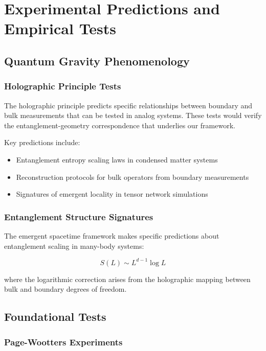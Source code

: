 \documentclass[12pt,a4paper]{article}
\begin{document}
\section{Experimental Predictions and Empirical Tests}

\subsection{Quantum Gravity Phenomenology}

\subsubsection{Holographic Principle Tests}

The holographic principle predicts specific relationships between boundary and bulk measurements that can be tested in analog systems. These tests would verify the entanglement-geometry correspondence that underlies our framework.

Key predictions include:
\begin{itemize}
    \item Entanglement entropy scaling laws in condensed matter systems
    \item Reconstruction protocols for bulk operators from boundary measurements
    \item Signatures of emergent locality in tensor network simulations
\end{itemize}

\subsubsection{Entanglement Structure Signatures}

The emergent spacetime framework makes specific predictions about entanglement scaling in many-body systems:

\begin{equation}
    S(L) \sim L^{d-1} \log L
\end{equation}

where the logarithmic correction arises from the holographic mapping between bulk and boundary degrees of freedom.

\subsection{Foundational Tests}

\subsubsection{Page-Wootters Experiments}
\end{document}
